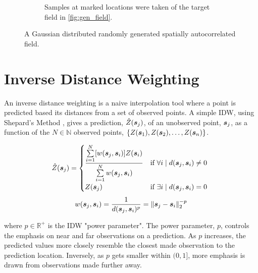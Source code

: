 \begin{figure}[ht!]
\begin{subfigure}[t]{0.5\textwidth}
		\captionsetup{skip=0.5\baselineskip,size=footnotesize}
		\caption{Samples at marked locations were taken of the target field in \ref{fig:gen_field}.}
		\label{fig:sampled_field}
    \end{subfigure}
    \caption{A Gaussian distributed randomly generated spatially autocorrelated field.}
    \label{fig:generated_and_sampled_field}
\end{figure}

\section{Inverse Distance Weighting} \label{sec:idw_intro}
An inverse distance weighting is a naive interpolation tool where a point is predicted based its distances from a set of observed points. A simple IDW, using Shepard's Method \cite{shepard:idw}, gives a prediction, $\hat{Z}({\it{\boldsymbol{s}}}_j)$, of an unobserved point, ${\it{\boldsymbol{s}}}_j$, as a function of the $N \in \mathbb{N}$ observed points, $\{Z({\it{\boldsymbol{s}}}_1), Z({\it{\boldsymbol{s}}}_2), \hdots, Z({\it{\boldsymbol{s}}}_n) \}$.

\begin{equation}
	\hat{Z}({\it{\boldsymbol{s}}}_j)=\begin{cases}
			\dfrac{\sum\limits_{i=1}^N [w({\it{\boldsymbol{s}}}_j, {\it{\boldsymbol{s}}}_i)] Z({\it{\boldsymbol{s}}}_i) }{\sum\limits_{i=1}^{N} w({\it{\boldsymbol{s}}}_j, {\it{\boldsymbol{s}}}_i)} & \text{if}\ \forall i \mid d({\it{\boldsymbol{s}}}_j,{\it{\boldsymbol{s}}}_i) \neq 0\ \\
			Z({\it{\boldsymbol{s}}}_j) & \text{if}\ \exists i \mid d({\it{\boldsymbol{s}}}_j,{\it{\boldsymbol{s}}}_i)=0\\
		\end{cases}
\end{equation}
\begin{equation}
	w({\it{\boldsymbol{s}}}_j, {\it{\boldsymbol{s}}}_i)=\frac{1}{d({\it{\boldsymbol{s}}}_j,{\it{\boldsymbol{s}}}_{i})^{p}}=\|{\it{\boldsymbol{s}}}_j-{\it{\boldsymbol{s}}}_i\|_{2}^{-p}
\end{equation}

where $p \in \mathbb{R}^{+}$ is the IDW "power parameter". The power parameter, $p$, controls the emphasis on near and far observations on a prediction. As $p$ increases, the predicted values more closely resemble the closest made observation to the prediction location. Inversely, as $p$ gets smaller within $(0, 1]$, more emphasis is drawn from observations made further away.\\

